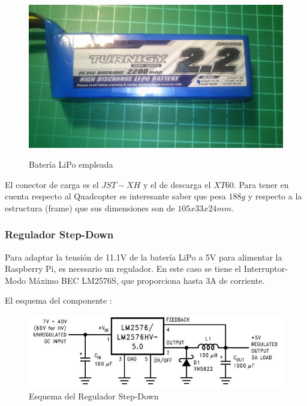 \documentclass[twoside,11pt]{report}
\begin{document}
\begin{figure}[h!]
\begin{center}
\includegraphics[scale=0.1,viewport=0 400 2560 1250,clip]{images/LiPo.jpg} \\
\caption{Batería LiPo empleada}
\end{center}
\end{figure}

El conector de carga es el $JST-XH$ y el de descarga el $XT60$. Para tener en cuenta respecto al Quadcopter es interesante saber que pesa $188g$ y respecto a la estructura (frame) que sus dimensiones son de $105x33x24mm$.

\subsubsection*{Regulador Step-Down}
Para adaptar la tensión de 11.1V de la batería LiPo a 5V para alimentar la Raspberry Pi, es necesario un regulador. En este caso se tiene el Interruptor-Modo Máximo BEC LM2576S, que proporciona hasta 3A de corriente.


El esquema del componente \cite{lm2576s}:

\begin{figure}[h!]
\begin{center}
\includegraphics[scale=0.55]{images/lm2576s.jpeg} 
\caption{Esquema del Regulador Step-Down}
\end{center}
\end{figure}
\end{document}
